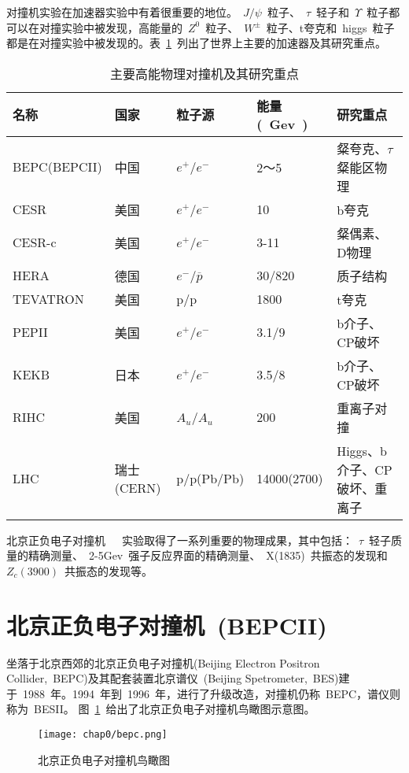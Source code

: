 对撞机实验在加速器实验中有着很重要的地位。~$J/\psi$~粒子、~$\tau$~轻子和~$\Upsilon$~粒子都可以在对撞实验中被发现，高能量的~$Z^{0}$~粒子、~$W^{\pm}$~粒子、t夸克和~higgs~粒子都是在对撞实验中被发现的。表~\ref{tbl:collider-accelerator}~列出了世界上主要的加速器及其研究重点。

\begin{table}[h]
    \centering
    \caption{\label{tbl:collider-accelerator} 主要高能物理对撞机及其研究重点}
    \footnotesize
    \begin{tabular}{lllll}
        \hline
        名称& 国家& 粒子源& 能量(~Gev~)& 研究重点\\
        \hline
        BEPC(BEPCII)& 中国& $e^{+}$/$e^{-}$& 2～5& 粲夸克、$\tau$粲能区物理 \\
        CESR& 美国& $e^{+}$/$e^{-}$& 10& b夸克 \\
        CESR-c& 美国& $e^{+}$/$e^{-}$& 3-11& 粲偶素、D物理 \\
        HERA& 德国&  $e^{-}$/$\overline{p}$&30/820& 质子结构\\
        TEVATRON& 美国& p/p&1800& t夸克\\
        PEPII& 美国& $e^{+}$/$e^{-}$& 3.1/9& b介子、CP破坏\\
        KEKB& 日本&   $e^{+}$/$e^{-}$& 3.5/8& b介子、CP破坏\\
        RIHC& 美国& $A_{u}$/$A_{u}$& 200& 重离子对撞\\
        LHC& 瑞士(CERN)& p/p(Pb/Pb)& 14000(2700)& Higgs、b介子、CP破坏、重离子\\
        \hline
    \end{tabular}
\end{table}

北京正负电子对撞机~\cite{xiejl1996}~\cite{ihep:2003}~\cite{ihep:2006}实验取得了一系列重要的物理成果，其中包括：~$\tau$~轻子质量的精确测量、~2-5Gev~强子反应界面的精确测量、~X(1835)~共振态的发现和~$Z_{c}(3900)$~\cite{BESIII:2013}共振态的发现等。

\section{北京正负电子对撞机~(BEPCII)~}

坐落于北京西郊的北京正负电子对撞机(Beijing Electron Positron Collider,~BEPC)及其配套装置北京谱仪~\cite{zhengzp2009}(Beijing Spetrometer,~BES)建于~1988~年。1994~年到~1996~年，进行了升级改造，对撞机仍称~BEPC，谱仪则称为~BESII。
图~\ref{fig:bepc}~给出了北京正负电子对撞机鸟瞰图示意图。
\begin{figure}[!h]
  \centering
  \texttt{[image: chap0/bepc.png]}
  \caption{北京正负电子对撞机鸟瞰图}
  \label{fig:bepc}
\end{figure}

